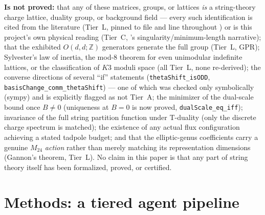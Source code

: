 \documentclass[11pt,a4paper]{article}
\theoremstyle{remark}
\begin{document}
\begin{scopebox}
\textbf{Is not proved:} that any of these matrices, groups, or lattices \emph{is} a string-theory
charge lattice, duality group, or background field --- every such identification is cited from the
literature (Tier~L, pinned to file and line throughout )
or is this project's own physical reading (Tier~C, 's singularity/minimum-length
narrative); that the exhibited $O(d,d;\mathbb{Z})$ generators generate the full group (Tier~L, GPR);
Sylvester's law of inertia, the mod-8 theorem for even unimodular indefinite lattices, or the
classification of $K3$ moduli space (all Tier~L, none re-derived); the converse directions of
several ``if'' statements (\texttt{thetaShift\_isODD}, \texttt{basisChange\_comm\_thetaShift}) ---
one of which was checked only symbolically (sympy) and is explicitly flagged as not Tier~A; the
minimizer of the dual-scale bound once $B\ne0$ (uniqueness at $B=0$ is now proved,
\texttt{dualScale\_eq\_iff}); invariance of the full string
partition function under T-duality (only the discrete charge spectrum is matched); the existence
of any actual flux configuration achieving a stated tadpole budget; and that the elliptic-genus
coefficients carry a genuine $M_{24}$ \emph{action} rather than merely matching its representation
dimensions (Gannon's theorem, Tier~L). No claim in this paper is that any part of string theory
itself has been formalized, proved, or certified.
\end{scopebox}

\section{Methods: a tiered agent pipeline}
\label{sec:methods}
\end{document}

